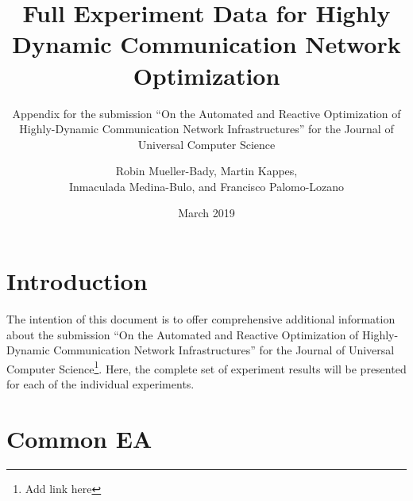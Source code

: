 \documentclass{scrartcl}
\title{Full Experiment Data for Highly Dynamic Communication Network Optimization}
\subtitle{Appendix for the submission ``On the Automated and Reactive Optimization of Highly-Dynamic Communication Network Infrastructures'' for the Journal of Universal Computer Science}
\author{Robin Mueller-Bady, Martin Kappes,\\Inmaculada Medina-Bulo, and Francisco Palomo-Lozano}
\date{March 2019}
\begin{document}
\maketitle
\section{Introduction}
The intention of this document is to offer comprehensive additional information about the submission ``On the Automated and Reactive Optimization of Highly-Dynamic Communication Network Infrastructures'' for the Journal of Universal Computer Science\footnote{Add link here}. Here, the complete set of experiment results will be presented for each of the individual experiments.

\newpage
\section{Common EA}
\end{document}
